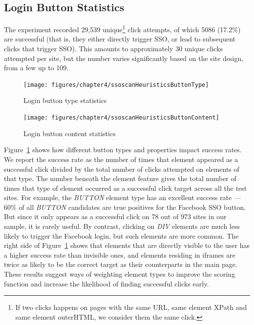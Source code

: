 \subsection{Login Button Statistics}
\label{sec:ssoscanHeuristicsLoginButtonStat}

The experiment recorded 29,539 unique\footnote{If two clicks happens on pages with the same URL, same element XPath and same element outerHTML, we consider them the same click.} click attempts, of which 5086 (17.2\%) are successful (that is, they either directly trigger SSO, or lead to subsequent clicks that trigger SSO).  This amounts to approximately 30 unique clicks attempted per site, but the number varies significantly based on the site design, from a few up to 109.

\begin{figure}[htb]
\centering
\texttt{[image: figures/chapter4/ssoscanHeuristicsButtonType]}
\caption{Login button type statistics}
\label{fig:ssoscanHeuristicsButtonType}
\end{figure}

\begin{figure}[htb]
\centering
\texttt{[image: figures/chapter4/ssoscanHeuristicsButtonContent]}
\caption{Login button content statistics}
\label{fig:ssoscanHeuristicsButtonContent}
\end{figure}

 Figure~\ref{fig:ssoscanHeuristicsButtonType} shows how different button types and properties impact success rates.  We report the success rate as the number of times that element appeared as a successful click divided by the total number of clicks attempted on elements of that type.  The number beneath the element feature gives the total number of times that type of element occurred as a successful click target across all the test sites.  For example, the \emph{BUTTON} element type has an excellent success rate --- 60\% of all \emph{BUTTON} candidates are true positives for the Facebook SSO button.  But since it only appears as a successful click on 78 out of 973 sites in our sample, it is rarely useful.  By contrast, clicking on \emph{DIV} elements are much less likely to trigger the Facebook login, but such elements are more common.  The right side of Figure~\ref{fig:ssoscanHeuristicsButtonType} shows that elements that are directly visible to the user has a higher success rate than invisible ones, and elements residing in iframes are twice as likely to be the correct target as their counterparts in the main page.  These results suggest ways of weighting element types to improve the scoring function and increase the likelihood of finding successful clicks early.

